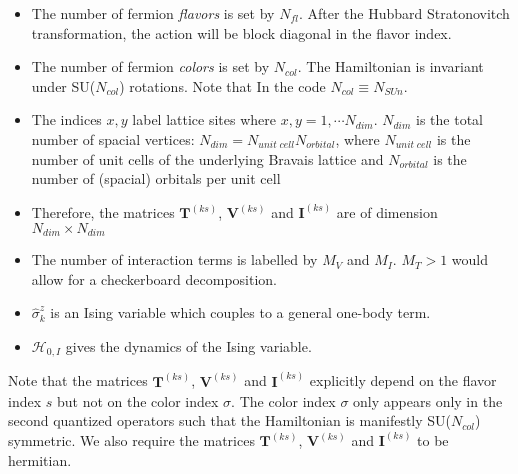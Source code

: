 \begin{itemize}
\item The number of fermion \textit{flavors} is set by $N_{fl}$.  After the Hubbard Stratonovitch transformation, the action will be block diagonal in the flavor index. 
\item The number of fermion \textit{colors} is set by $N_{col}$.    The Hamiltonian is invariant under  SU($N_{col}$)  rotations. Note that  In the code $ N_{col} \equiv N_{SUn} $. 
\item The indices $x,y$ label lattice sites where $x,y=1,\cdots N_{dim}$. 
$N_{dim}$ is the total number of spacial vertices: $N_{dim}=N_{unit\;cell} N_{orbital}$, where $N_{unit\;cell}$ is the number of unit cells of the underlying Bravais lattice and $N_{orbital}$ is the number of (spacial) orbitals per unit cell  
\item Therefore, the  matrices $\bm{T}^{(k s)}$, $\bm{V}^{(ks)}$  and $\bm{I}^{(ks)}$ are  of dimension $N_{dim}\times N_{dim}$
\item The number of interaction terms  is labelled by $M_V$   and $M_I$.   $M_T> 1 $ would allow for a checkerboard decomposition. 
\item $\hat{\sigma}^z_k$ is an Ising variable which couples to a general one-body term. 
\item  $\mathcal{H}_{0,I}$  gives the dynamics of the Ising variable. 
\end{itemize}
Note that the matrices  $\bm{T}^{(ks)}$,  $\bm{V}^{(ks)}$ and  $\bm{I}^{(ks)}$ explicitly depend on the flavor index $s$ but not on the color index $\sigma$. 
The color index $\sigma$ only appears only in  the  second quantized operators such that the Hamiltonian is manifestly SU($N_{col}$)    symmetric.  We also require
the matrices $\bm{T}^{(ks)}$,  $\bm{V}^{(ks)}$ and  $\bm{I}^{(ks)}$  to be  hermitian. 


